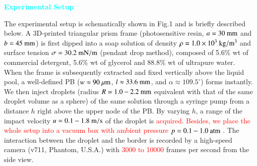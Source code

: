 \documentclass[%
 preprint,
 superscriptaddress,
 amsmath,amssymb,
 aps, prl,
]{revtex4-2}
\begin{document}
\textcolor{cyan}{\textbf{Experimental Setup}}\par
    {\color{black}
    The experimental setup is schematically shown in Fig.1 and is briefly described below. A 3D-printed triangular prism frame (photosensitive resin, $a = 30\ {\rm mm}$ and $b = 45\ {\rm mm}$) is first dipped into a soap solution of density $\rho = 1.0 \times 10^3\ {\rm kg/m^3}$ and surface tension $\sigma = 30.2\ {\rm mN/m}$ (pendant drop method), composed of 5.6$\%$ wt of commercial detergent, 5.6$\%$ wt of glycerol and 88.8$\%$ wt of ultrapure water. When the frame is subsequently extracted and fixed vertically above the liquid pool, a well-defined PB ($w\approx 90\ {\rm \mu m}$, $l\approx 33.6\ {\rm mm}$, and $\alpha \approx 109.5^{\circ}$) forms instantly. We then inject droplets (radius $R = 1.0-2.2\ {\rm mm}$ equivalent with that of the same droplet volume as a sphere) of the same solution through a syringe pump from a distance $h$ right above the upper node of the PB. By varying $h$, a range of the impact velocity $u = 0.1-1.8\ {\rm m/s}$ of the droplet is \textcolor{red}{acquired. Besides, we place the whole setup into a vacuum box with ambient pressure $p = 0.1-1.0\ {\rm atm}$ }. The interaction between the droplet and the border is recorded by a high-speed camera (v711, Phantom, U.S.A.) with \textcolor{red}{3000 to 10000} frames per second from the side view.\par
    }
\end{document}
